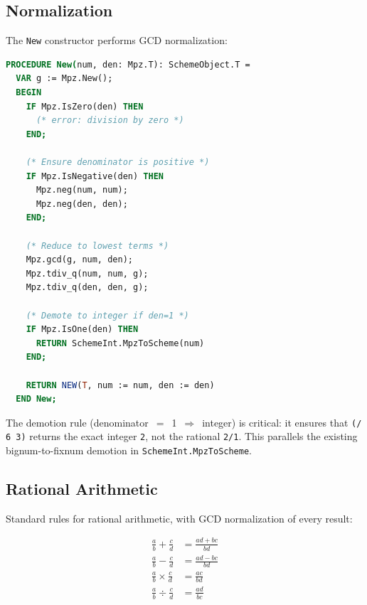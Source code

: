 \documentclass[12pt]{article}
\begin{document}
\subsection{Normalization}

The {\tt New} constructor performs GCD normalization:

\begin{lstlisting}[language=Modula3]
PROCEDURE New(num, den: Mpz.T): SchemeObject.T =
  VAR g := Mpz.New();
  BEGIN
    IF Mpz.IsZero(den) THEN
      (* error: division by zero *)
    END;

    (* Ensure denominator is positive *)
    IF Mpz.IsNegative(den) THEN
      Mpz.neg(num, num);
      Mpz.neg(den, den);
    END;

    (* Reduce to lowest terms *)
    Mpz.gcd(g, num, den);
    Mpz.tdiv_q(num, num, g);
    Mpz.tdiv_q(den, den, g);

    (* Demote to integer if den=1 *)
    IF Mpz.IsOne(den) THEN
      RETURN SchemeInt.MpzToScheme(num)
    END;

    RETURN NEW(T, num := num, den := den)
  END New;
\end{lstlisting}

\noindent The demotion rule (denominator~$=$~1~$\Rightarrow$~integer)
is critical: it ensures that {\tt (/ 6 3)} returns the exact integer
{\tt 2}, not the rational {\tt 2/1}.  This parallels the existing
bignum-to-fixnum demotion in {\tt SchemeInt.MpzToScheme}.

\subsection{Rational Arithmetic}

Standard rules for rational arithmetic, with GCD normalization of
every result:

\begin{align*}
\frac{a}{b} + \frac{c}{d} &= \frac{ad + bc}{bd} \\[4pt]
\frac{a}{b} - \frac{c}{d} &= \frac{ad - bc}{bd} \\[4pt]
\frac{a}{b} \times \frac{c}{d} &= \frac{ac}{bd} \\[4pt]
\frac{a}{b} \div \frac{c}{d} &= \frac{ad}{bc}
\end{align*}
\end{document}
